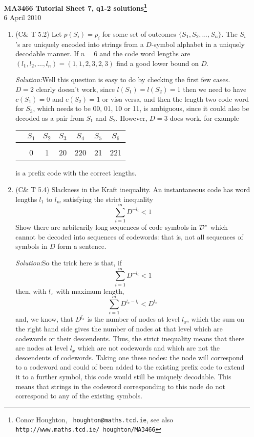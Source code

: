 \documentclass[12pt]{article}
\newcommand{\soln}{\noindent\textit{Solution:}}
\begin{document}
\begin{center}
{\bf MA3466 Tutorial Sheet 7, q1-2 solutions\footnote{Conor Houghton, {\tt
      houghton@maths.tcd.ie}, see also {\tt
      http://www.maths.tcd.ie/ houghton/MA3466}}}\\[1cm]{} 6
April 2010
\end{center}
\begin{enumerate}

\item (C\& T 5.2) Let $p(S_i)=p_i$ for some set of outcomes $\{S_1,S_2,\ldots,S_n\}$. The $S_i$'s are uniquely encoded into strings from a $D$-symbol alphabet in a uniquely decodable manner. If $n=6$ and the code word lengths are $(l_1,l_2,\ldots,l_n)=(1,1,2,3,2,3)$ find a good lower bound on $D$.

\soln Well this question is easy to do by checking the first few cases. $D=2$ clearly doesn't work, since $l(S_1)=l(S_2)=1$ then we need to have $c(S_1)=0$ and $c(S_2)=1$ or visa versa, and then the length two code word for $S_3$, which needs to be 00, 01, 10 or 11, is ambiguous, since it could also be decoded as a pair from $S_1$ and $S_2$. However, $D=3$ does work, for example
\begin{center}
\begin{tabular}{c|cccccc}
&$S_1$&$S_2$&$S_3$&$S_4$&$S_5$&$S_6$\\
\hline\\
&0&1&20&220&21&221
\end{tabular}
\end{center}
is a prefix code with the correct lengths.


\item (C\& T 5.4) Slackness in the Kraft inequality. An instantaneous code has word lengths $l_1$ to $l_m$ satisfying the strict inequality
\begin{equation}
\sum_{i=1}^m{D^{-l_i}}<1
\end{equation}
Show there are arbitrarily long sequences of code symbols in ${\cal D}^*$ which cannot be decoded into sequences of codewords: that is, not all sequences of symbols in $D$ form a sentence.

\soln So the trick here is that, if 
\begin{equation}
\sum_{i=1}^m{D^{-l_i}}<1
\end{equation}
then, with $l_x$ with maximum length,
\begin{equation}
\sum_{i=1}^m{D^{l_x-l_i}}<D^{l_x}
\end{equation}
and, we know, that $D^{l_x}$ is the number of nodes at level $l_x$,
which the sum on the right hand side gives the number of nodes at that
level which are codewords or their descendents. Thus, the strict
inequality means that there are nodes at level $l_x$ which are not
codewords and which are not the descendents of codewords. Taking one
these nodes: the node will correspond to a codeword and could of been
added to the existing prefix code to extend it to a further symbol,
this code would still be uniquely decodable. This means that strings
in the codeword corresponding to this node do not correspond to any of
the existing symbols.

\end{enumerate}
\end{document}
